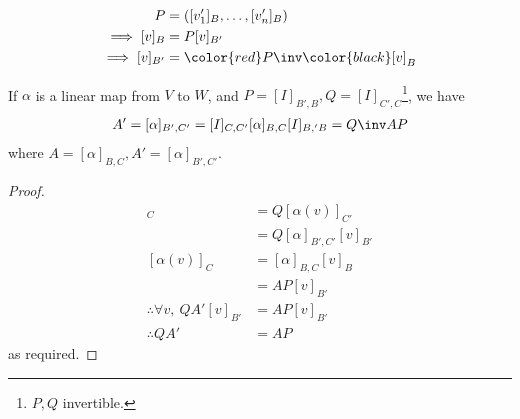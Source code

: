 \begin{warning} ~\vspace*{-1.5\baselineskip}
    \begin{align*}
        P &= ([v_1']_B, \dots, [v_n']_B) \\
        \implies [v]_B &= P [v]_{B'} \\
        \implies [v]_{B'} &= \color{red}P\inv\color{black} [v]_B
    \end{align*} 
\end{warning} 
\begin{proposition}
    If $\alpha$ is a linear map from $V$ to $W$, and $P = [I]_{B',B}, Q = [I]_{C',C}$\footnote{$P, Q$ invertible.}, we have
    \begin{align*}
        A' = [\alpha]_{B',C'} = [I]_{C,C'}[\alpha]_{B,C}[I]_{B,'B} = Q\inv AP
    \end{align*}
    where $A = [\alpha]_{B,C}, A' = [\alpha]_{B',C'}$.
\end{proposition}
\begin{proof}
    \begin{align*}
        [\alpha(v)]_C & = Q [\alpha(v)]_{C'} \\
        &= Q [\alpha]_{B',C'} [v]_{B'} \\
        [\alpha(v)]_C &= [\alpha]_{B,C} [v]_B \\
        &= AP[v]_{B'} \\
        \therefore \forall v,\ QA'[v]_{B'} &= AP[v]_{B'} \\
        \therefore QA' &= AP
    \end{align*}
    as required.
\end{proof}

